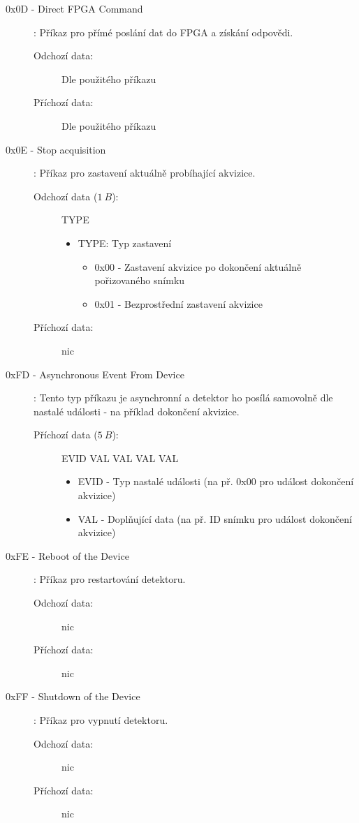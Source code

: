\begin{description}
\begin{description}
\begin{itemize}
				\end{itemize}
		\end{description}
	\item[0x0D - Direct FPGA Command]:
		Příkaz pro přímé poslání dat do FPGA a získání odpovědi.
		\begin{description}
			\item[Odchozí data:] Dle použitého příkazu
			\item[Příchozí data:] Dle použitého příkazu
		\end{description}
	\item[0x0E - Stop acquisition]:
		Příkaz pro zastavení aktuálně probíhající akvizice.
		\begin{description}
			\item[Odchozí data ($1~B$):] TYPE
				\begin{itemize}
					\item TYPE: Typ zastavení
						\begin{itemize}
							\item 0x00 - Zastavení akvizice po dokončení aktuálně pořizovaného snímku
							\item 0x01 - Bezprostřední zastavení akvizice 
						\end{itemize}
				\end{itemize}
			\item[Příchozí data:] nic
		\end{description}
	\item[0xFD - Asynchronous Event From Device]:
		Tento typ příkazu je asynchronní a detektor ho posílá samovolně dle nastalé události - na příklad dokončení akvizice.
		\begin{description}
			\item[Příchozí data ($5~B$):] EVID VAL VAL VAL VAL
				\begin{itemize}
					\item EVID - Typ nastalé události (na př. 0x00 pro událost dokončení akvizice)
					\item VAL - Doplňující data (na př. ID snímku pro událost dokončení akvizice)
				\end{itemize}
		\end{description}
	\item[0xFE - Reboot of the Device]:
		Příkaz pro restartování detektoru.
		\begin{description}
			\item[Odchozí data:] nic
			\item[Příchozí data:] nic
		\end{description}
	\item[0xFF - Shutdown of the Device]:
		Příkaz pro vypnutí detektoru.
		\begin{description}
			\item[Odchozí data:] nic
			\item[Příchozí data:] nic
		\end{description}
\end{description}


